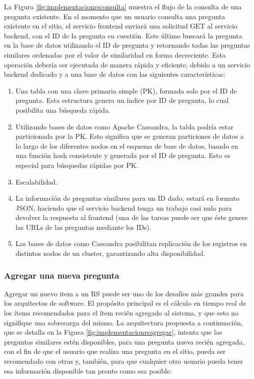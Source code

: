 \bigskip La Figura \ref{fig:implementacionrsconsulta} muestra el flujo de la consulta de una pregunta existente. En el momento que un usuario consulta una pregunta existente en el sitio, el servicio frontend enviará una solicitud GET al servicio backend, con el ID de la pregunta en cuestión. Este último buscará la pregunta en la base de datos utilizando el ID de pregunta y retornando todas las preguntas similares ordenadas por el valor de similaridad en forma decreciente. Esta operación debería ser ejecutada de manera rápida y eficiente, debido a un servicio backend dedicado y a una base de datos con las siguientes características:
\begin{enumerate}
	\item Una tabla con una clave primaria simple (PK), formada solo por el ID de pregunta. Esta estructura genera un índice por ID de pregunta, lo cual posibilita una búsqueda rápida.
	\item Utilizando bases de datos como Apache Cassandra,  la tabla podría estar particionada por la PK. Esto significa que se generan particiones de datos a lo largo de los diferentes nodos en el esquema de base de datos, basado en una función hash consistente y generada por el ID de pregunta. Esto es especial para búsquedas rápidas por PK.
	\item Escalabilidad.
	\item La información de preguntas similares para un ID dado, estará en formato JSON, haciendo que el servicio backend tenga un trabajo casi nulo para devolver la respuesta al frontend (una de las tareas puede ser que éste genere las URLs de las preguntas mediante los IDs).
	\item Las bases de datos como Cassandra posibilitan replicación de los registros en distintos nodos de un cluster, garantizando alta disponibilidad.
\end{enumerate}

\subsubsection{Agregar una nueva pregunta}
Agregar un nuevo item a un RS puede ser uno de los desafíos más grandes para los arquitectos de software. El propósito principal es el cálculo en tiempo real de los ítems recomendados para el ítem recién agregado al sistema, y que esto no signifique una sobrecarga del mismo. La arquitectura propuesta a continuación, que se detalla en la Figura \ref{fig:implementacionrsagregar}, intenta que las preguntas similares estén disponibles, para una pregunta nueva recién agregada, con el fin de que el usuario que realiza una pregunta en el sitio, pueda ser recomendado con otras y, también, para que cualquier otro usuario pueda tener esa información disponible tan pronto como sea posible.


